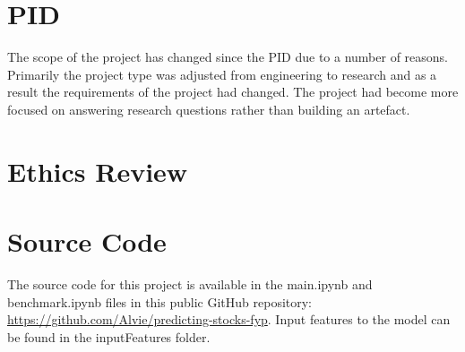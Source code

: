\documentclass[12pt, a4paper]{report}
\begin{document}
\newpage
{}
{}
\printbibliography

\appendix
\chapter{PID}
The scope of the project has changed since the PID due to a number of reasons. Primarily the project
type was adjusted from engineering to research and as a result the requirements of the project had changed.
The project had become more focused on answering research questions rather than building an artefact.


\chapter{Ethics Review}


\chapter{Source Code}
The source code for this project is available in the main.ipynb and benchmark.ipynb files in this
public GitHub repository: \url{https://github.com/Alvie/predicting-stocks-fyp}. Input features to
the model can be found in the inputFeatures folder.
\end{document}
